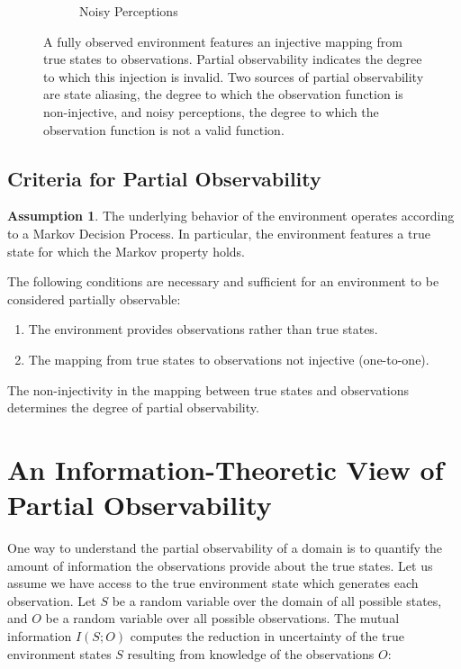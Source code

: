 \documentclass{article} %
\theoremstyle{definition}
\newtheorem{assumption}{Assumption}
\begin{document}
\begin{figure}[htp]
\begin{subfigure}{.3\textwidth}
  \caption{Noisy Perceptions}
  \label{fig:noisy-perception}
\end{subfigure}
\caption{A fully observed environment features an injective mapping
  from true states to observations. Partial observability indicates
  the degree to which this injection is invalid. Two sources of
  partial observability are state aliasing, the degree to which the
  observation function is non-injective, and noisy perceptions, the
  degree to which the observation function is not a valid function.}
\label{fig:functions}
\end{figure}

\subsection{Criteria for Partial Observability}
\begin{assumption}
The underlying behavior of the environment operates according to a
Markov Decision Process. In particular, the environment features a
true state for which the Markov property holds.
\end{assumption}

The following conditions are necessary and sufficient for an
environment to be considered partially observable:

\begin{enumerate}
\item The environment provides observations rather than true states.
\item The mapping from true states to observations not injective (one-to-one).
\end{enumerate}

The non-injectivity in the mapping between true states and
observations determines the degree of partial observability.

\section{An Information-Theoretic View of Partial Observability}
One way to understand the partial observability of a domain is to
quantify the amount of information the observations provide about the
true states. Let us assume we have access to the true environment
state which generates each observation. Let $S$ be a random variable
over the domain of all possible states, and $O$ be a random variable
over all possible observations. The mutual information $I(S;O)$
computes the reduction in uncertainty of the true environment states
$S$ resulting from knowledge of the observations $O$:
\end{document}
